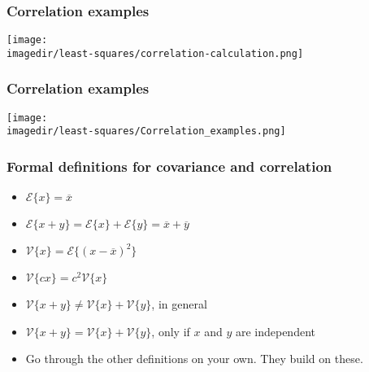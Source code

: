 \begin{frame}\frametitle{Correlation examples}
	\begin{center}
		\texttt{[image: \\imagedir/least-squares/correlation-calculation.png]}
	\end{center}
\end{frame}

\begin{frame}\frametitle{Correlation examples}
	\begin{center}
		\texttt{[image: \\imagedir/least-squares/Correlation\_examples.png]}
	\end{center}
\end{frame}

\begin{frame}\frametitle{Formal definitions for covariance and correlation}
	\begin{itemize}
		\item	$\mathcal{E}\{x\} = \overline{x}$
		\item	$\mathcal{E}\{x+y\} = \mathcal{E}\{x\} + \mathcal{E}\{y\} = \overline{x} + \overline{y}$
		\item	$\mathcal{V}\{x\} = \mathcal{E}\{(x-\overline{x})^2\}$
		\item	$\mathcal{V}\{cx\} = c^2\mathcal{V}\{x\}$
		\item	$\mathcal{V}\{x+y\} \neq \mathcal{V}\{x\} + \mathcal{V}\{y\}$, in general
		\item	$\mathcal{V}\{x+y\} = \mathcal{V}\{x\} + \mathcal{V}\{y\}$, only if $x$ and $y$ are independent
		\item	Go through the other definitions on your own. They build on these.
	\end{itemize}
\end{frame}

